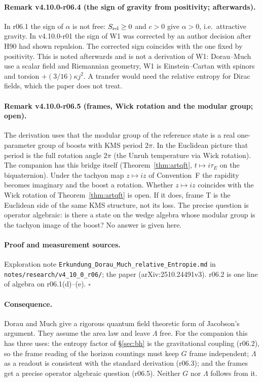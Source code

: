 \paragraph{Remark v4.10.0-r06.4 (the sign of gravity from positivity; afterwards).}
In r06.1 the sign of \(\alpha\) is not free: \(S_{\rm rel}\ge0\) and \(c>0\) give \(\alpha>0\), i.e.\ attractive gravity.  In v4.10.0-r01 the sign of W1 was
corrected by an author decision after H90 had shown repulsion.  The corrected sign coincides with the one fixed by positivity.  This is noted afterwards
and is not a derivation of W1: Dorau--Much use a scalar field and Riemannian geometry, W1 is Einstein--Cartan with spinors and torsion
\(+(3/16)\kappa j^2\).  A transfer would need the relative entropy for Dirac fields, which the paper does not treat.

\paragraph{Remark v4.10.0-r06.5 (frames, Wick rotation and the modular group; open).}
The derivation uses that the modular group of the reference state is a real one-parameter group of boosts with KMS period \(2\pi\).  In the Euclidean
picture that period is the full rotation angle \(2\pi\) (the Unruh temperature via Wick rotation).  The companion has this bridge itself
(Theorem~\ref{thm:artqft}, \(t\mapsto i\tau_E\) on the biquaternion).  Under the tachyon map \(z\mapsto iz\) of Convention~F the rapidity becomes
imaginary and the boost a rotation.  Whether \(z\mapsto iz\) coincides with the Wick rotation of Theorem~\ref{thm:artqft} is open.  If it does, frame T is
the Euclidean side of the same KMS structure, not its loss.  The precise question is operator algebraic: is there a state on the wedge algebra whose
modular group is the tachyon image of the boost?  No answer is given here.

\paragraph{Proof and measurement sources.}
Exploration note \texttt{Erkundung\_\allowbreak Dorau\_\allowbreak Much\_\allowbreak relative\_\allowbreak Entropie.md} in
\texttt{notes/\allowbreak research/\allowbreak v4\_10\_0\_r06/}; the paper (arXiv:2510.24491v3).  r06.2 is one line of algebra on r06.1(d)--(e).  \(\square\)

\paragraph{Consequence.}
Dorau and Much give a rigorous quantum field theoretic form of Jacobson's argument.  They assume the area law and leave \(\Lambda\) free.  For the
companion this has three uses: the entropy factor of \S\ref{sec:bh} is the gravitational coupling (r06.2), so the frame reading of the horizon
countings must keep \(G\) frame independent; \(\Lambda\) as a readout is consistent with the standard derivation (r06.3); and the frames get a precise
operator algebraic question (r06.5).  Neither \(G\) nor \(\Lambda\) follows from it.

